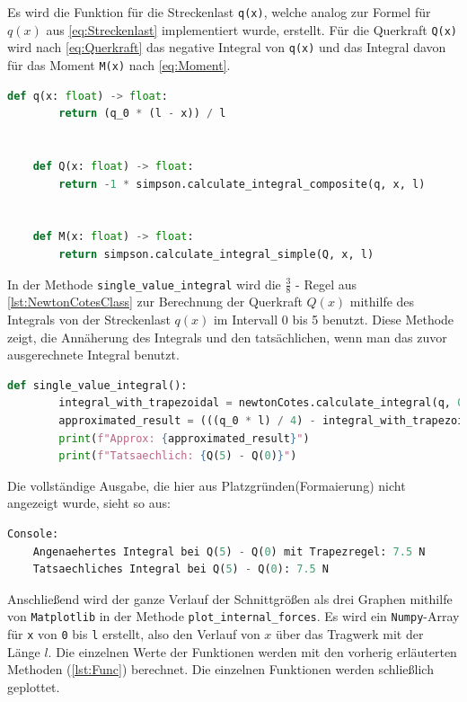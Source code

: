 Es wird die Funktion für die Streckenlast \texttt{q(x)}, welche analog zur Formel für $q(x)$ aus \ref{eq:Streckenlast} implementiert wurde, erstellt.
Für die Querkraft \texttt{Q(x)} wird nach \ref{eq:Querkraft} das negative Integral von \texttt{q(x)} und das Integral davon für das Moment \texttt{M(x)} nach \ref{eq:Moment}.

\begin{lstlisting}[language=Python, label={lst:Func}]
    def q(x: float) -> float:
        return (q_0 * (l - x)) / l
    
    
    def Q(x: float) -> float:
        return -1 * simpson.calculate_integral_composite(q, x, l)
    
    
    def M(x: float) -> float:
        return simpson.calculate_integral_simple(Q, x, l)
\end{lstlisting}

In der Methode \texttt{single\_value\_integral} wird die $\frac{3}{8}$ - Regel aus \ref{lst:NewtonCotesClass} zur Berechnung der Querkraft $Q(x)$ mithilfe des Integrals von der Streckenlast $q(x)$ im Intervall 0 bis 5 benutzt. Diese Methode zeigt, die Annäherung des Integrals und den tatsächlichen, wenn man das zuvor ausgerechnete Integral benutzt.

\begin{lstlisting}[language=Python]
    def single_value_integral():
        integral_with_trapezoidal = newtonCotes.calculate_integral(q, 0, 5)
        approximated_result = (((q_0 * l) / 4) - integral_with_trapezoidal)
        print(f"Approx: {approximated_result}")
        print(f"Tatsaechlich: {Q(5) - Q(0)}")
\end{lstlisting}

Die vollständige Ausgabe, die hier aus Platzgründen(Formaierung) nicht angezeigt wurde, sieht so aus:

\begin{lstlisting}[language=Python]
Console:
    Angenaehertes Integral bei Q(5) - Q(0) mit Trapezregel: 7.5 N
    Tatsaechliches Integral bei Q(5) - Q(0): 7.5 N
\end{lstlisting}

Anschließend wird der ganze Verlauf der Schnittgrößen als drei Graphen mithilfe von \texttt{Matplotlib} in der Methode \texttt{plot\_internal\_forces}. Es wird ein \texttt{Numpy}-Array für \texttt{x} von \texttt{0} bis \texttt{l} erstellt, also den Verlauf von $x$ über das Tragwerk mit der Länge $l$. Die einzelnen Werte der Funktionen werden mit den vorherig erläuterten Methoden (\ref{lst:Func}) berechnet. Die einzelnen Funktionen werden schließlich geplottet.

